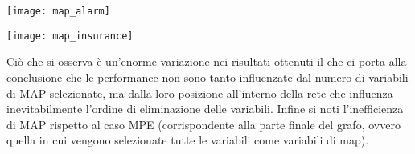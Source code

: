 \begin{minipage}{\linewidth}
	\centering
	\texttt{[image: map\_alarm]}
	\label{map_alarm} 
\end{minipage}
 
\begin{minipage}{\linewidth}
	\centering
	\texttt{[image: map\_insurance]}
	\label{map_insurance} 
\end{minipage}

Ciò che si osserva è un’enorme variazione nei risultati ottenuti il che ci porta alla conclusione che le performance non sono tanto influenzate dal numero di variabili di MAP selezionate, ma dalla loro posizione all’interno della rete che influenza inevitabilmente l’ordine di eliminazione delle variabili. Infine si noti l’inefficienza di MAP rispetto al caso MPE (corrispondente alla parte finale del grafo, ovvero quella in cui vengono selezionate tutte le variabili come variabili di map). 


